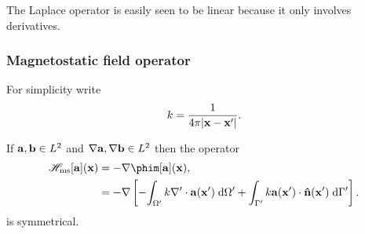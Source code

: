 The Laplace operator is easily seen to be linear because it only involves derivatives.


\subsubsection{Magnetostatic field operator}

For simplicity write
\begin{equation}
  k = \frac{1}{4\pi \lvert \mathbf{x} - \mathbf{x}' \rvert}.
\end{equation}

\begin{theorem}
  If ${\mathbf{a}}, {\mathbf{b}} \in L^2$ and $\nabla {\mathbf{a}}, \nabla{\mathbf{b}} \in L^2$ then the operator
  \begin{equation}
    \begin{aligned}
      \hmsop [\av](\xv) &= - \grad \phim[\av](\xv), \\
      &= -\grad \left[-\intd[\magd']{\knl \nabla' \cdot \av(\xv')}
          + \intd[\boundd']{\knl \av(\xv') \cdot \nv(\xv')} \right].
    \end{aligned}
  \end{equation}
  is symmetrical.
\end{theorem}

